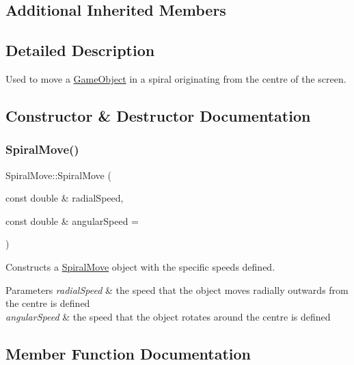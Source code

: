 \subsection*{Additional Inherited Members}


\subsection{Detailed Description}
Used to move a \hyperlink{class_game_object}{Game\+Object} in a spiral originating from the centre of the screen. 

\subsection{Constructor \& Destructor Documentation}
\mbox{\label{class_spiral_move_ac66bcfdc562914510243832d4762f148}} 
\subsubsection{\texorpdfstring{Spiral\+Move()}{SpiralMove()}}
{\footnotesize\ttfamily Spiral\+Move\+::\+Spiral\+Move (\begin{DoxyParamCaption}\item[{const double \&}]{radial\+Speed,  }\item[{const double \&}]{angular\+Speed = {} }\end{DoxyParamCaption})}



Constructs a \hyperlink{class_spiral_move}{Spiral\+Move} object with the specific speeds defined. 


\begin{DoxyParams}{Parameters}
{\em radial\+Speed} & the speed that the object moves radially outwards from the centre is defined \\
\hline
{\em angular\+Speed} & the speed that the object rotates around the centre is defined \\
\hline
\end{DoxyParams}


\subsection{Member Function Documentation}
\mbox{\label{class_spiral_move_a74b22995f5f3c00c623ecaa3adb2ab8e}} 
